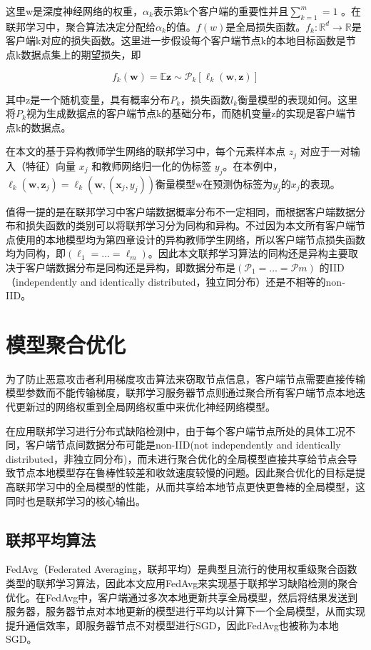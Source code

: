 这里w是深度神经网络的权重，$\alpha_{k}$表示第k个客户端的重要性并且$\sum_{k=1}^{m}=1$ 。在联邦学习中，聚合算法决定分配给$\alpha_{k}$的值。$f(w)$是全局损失函数。$f_{k}: \mathbb{R}^{d} \rightarrow \mathbb{R}$是客户端k对应的损失函数。这里进一步假设每个客户端节点k的本地目标函数是节点k数据点集上的期望损失，即

\begin{equation}
  f_{k}(\boldsymbol{w})=\mathbb{E}{\boldsymbol{z} \sim \mathcal{P}_{k}}\left[\ell_{k}(\boldsymbol{w}, \boldsymbol{z})\right]
\end{equation}

其中z是一个随机变量，具有概率分布$P_{k}$，损失函数$l_{k}$衡量模型的表现如何。这里将$P_{k}$视为生成数据点的客户端节点k的基础分布，而随机变量z的实现是客户端节点k的数据点。

在本文的基于异构教师学生网络的联邦学习中，每个元素样本点 $z_{j}$ 对应于一对输入（特征）向量 $x_{j}$ 和教师网络归一化的伪标签 $y_{j}$。在本例中，$\ell_{k}\left(\boldsymbol{w}, \boldsymbol{z}_{j}\right)=\ell_{k}\left(\boldsymbol{w},\left(\boldsymbol{x}_{j}, y_{j}\right)\right)$衡量模型w在预测伪标签为$y_{j}$的$x_{j}$的表现。

值得一提的是在联邦学习中客户端数据概率分布不一定相同，而根据客户端数据分布和损失函数的类别可以将联邦学习分为同构和异构。不过因为本文所有客户端节点使用的本地模型均为第四章设计的异构教师学生网络，所以客户端节点损失函数均为同构，即$\left(\ell_{1}=\ldots=\ell_{m}\right)$。因此本文联邦学习算法的同构还是异构主要取决于客户端数据分布是同构还是异构，即数据分布是$\left(\mathcal{P}_{1}=\ldots=\mathcal{P}{m}\right)$ 的IID（independently and identically distributed，独立同分布）还是不相等的non-IID。
\section{模型聚合优化}
为了防止恶意攻击者利用梯度攻击算法来窃取节点信息，客户端节点需要直接传输模型参数而不能传输梯度，联邦学习服务器节点则通过聚合所有客户端节点本地迭代更新过的网络权重到全局网络权重中来优化神经网络模型。\cite{zengFedLabFlexibleFederated2022}

在应用联邦学习进行分布式缺陷检测中，由于每个客户端节点所处的具体工况不同，客户端节点间数据分布可能是non-IID(not independently and identically distributed，非独立同分布)，而未进行聚合优化的全局模型直接共享给节点会导致节点本地模型存在鲁棒性较差和收敛速度较慢的问题。因此聚合优化的目标是提高联邦学习中的全局模型的性能，从而共享给本地节点更快更鲁棒的全局模型，这同时也是联邦学习的核心输出。
\subsection{联邦平均算法}
FedAvg（Federated Averaging，联邦平均）是典型且流行的使用权重级聚合函数类型的联邦学习算法，因此本文应用FedAvg来实现基于联邦学习缺陷检测的聚合优化。在FedAvg中，客户端通过多次本地更新共享全局模型，然后将结果发送到服务器，服务器节点对本地更新的模型进行平均以计算下一个全局模型，从而实现提升通信效率，即服务器节点不对模型进行SGD，因此FedAvg也被称为本地SGD。\cite{collinsFedAvgFineTuning2022,mcmahanCommunicationEfficientLearningDeep2023}

